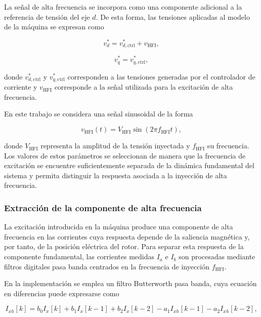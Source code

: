 La señal de alta frecuencia se incorpora como una componente adicional a la referencia de tensión del eje $d$. De esta forma, las tensiones aplicadas al modelo de la máquina se expresan como

\begin{equation}
v_d^{*}
=
v_{d,\mathrm{ctrl}}^{*}
+
v_{\mathrm{HFI}},
\label{eq:vd_hfi}
\end{equation}

\begin{equation}
v_q^{*}
=
v_{q,\mathrm{ctrl}}^{*},
\label{eq:vq_hfi}
\end{equation}

donde $v_{d,\mathrm{ctrl}}^{*}$ y $v_{q,\mathrm{ctrl}}^{*}$ corresponden a las tensiones generadas por el controlador de corriente y $v_{\mathrm{HFI}}$ corresponde a la señal utilizada para la excitación de alta frecuencia.

En este trabajo se considera una señal sinusoidal de la forma

\begin{equation}
v_{\mathrm{HFI}}(t)
=
V_{\mathrm{HFI}}
\sin\left(2\pi f_{\mathrm{HFI}}t\right),
\label{eq:senal_hfi}
\end{equation}

donde $V_{\mathrm{HFI}}$ representa la amplitud de la tensión inyectada y $f_{\mathrm{HFI}}$ su frecuencia. Los valores de estos parámetros se seleccionan de manera que la frecuencia de excitación se encuentre suficientemente separada de la dinámica fundamental del sistema y permita distinguir la respuesta asociada a la inyección de alta frecuencia.

\subsubsection{Extracción de la componente de alta frecuencia}
\label{subsubsec:extraccion_hfi}

La excitación introducida en la máquina produce una componente de alta frecuencia en las corrientes cuya respuesta depende de la saliencia magnética y, por tanto, de la posición eléctrica del rotor. Para separar esta respuesta de la componente fundamental, las corrientes medidas $I_a$ e $I_b$ son procesadas mediante filtros digitales pasa banda centrados en la frecuencia de inyección $f_{\mathrm{HFI}}$.

En la implementación se emplea un filtro Butterworth pasa banda, cuya ecuación en diferencias puede expresarse como

\begin{equation}
I_{xh}[k]
=
b_0 I_x[k]
+
b_1 I_x[k-1]
+
b_2 I_x[k-2]
-
a_1 I_{xh}[k-1]
-
a_2 I_{xh}[k-2],
\label{eq:bpf_hfi}
\end{equation}

